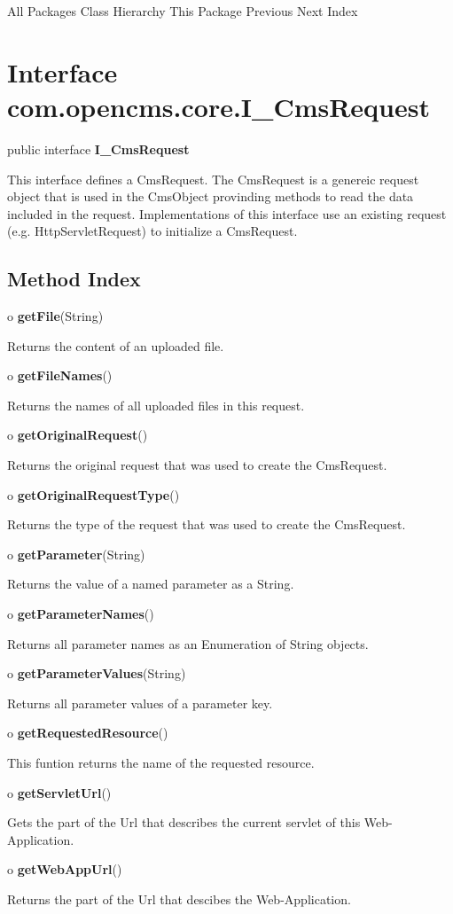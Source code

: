 \begin{PRE}
All Packages  Class Hierarchy  This Package  Previous  Next  Index
\end{PRE}

\htmlHR

\section{  Interface com.opencms.core.I\_CmsRequest }

\begin{description}
\item public interface {\bf I\_CmsRequest} 
\end{description}

This interface defines a CmsRequest. The CmsRequest is a genereic request
object that is used in the CmsObject provinding methods to read the data
included in the request. Implementations of this interface use an existing
request (e.g. HttpServletRequest) to initialize a CmsRequest. 

\htmlHR

\subsection*{  Method Index }

\begin{description}
\item o {\bf getFile}(String)  

Returns the content of an uploaded file.  
\item o {\bf getFileNames}()  

Returns the names of all uploaded files in this request.  
\item o {\bf getOriginalRequest}()  

Returns the original request that was used to create the CmsRequest.  
\item o {\bf getOriginalRequestType}()  

Returns the type of the request that was used to create the CmsRequest.  
\item o {\bf getParameter}(String)  

Returns the value of a named parameter as a String.  
\item o {\bf getParameterNames}()  

Returns all parameter names as an Enumeration of String objects.  
\item o {\bf getParameterValues}(String)  

Returns all parameter values of a parameter key.  
\item o {\bf getRequestedResource}()  

This funtion returns the name of the requested resource.  
\item o {\bf getServletUrl}()  

Gets the part of the Url that describes the current servlet of this
Web-Application.  
\item o {\bf getWebAppUrl}()  

Returns the part of the Url that descibes the Web-Application. 
\end{description}

